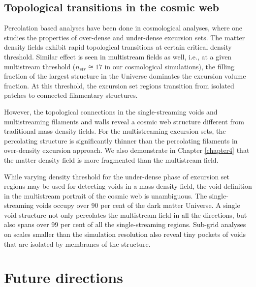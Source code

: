 \subsection{Topological transitions in the cosmic web}

Percolation based analyses have been done in cosmological analyses, where one studies the properties of over-dense and under-dense excursion sets. The matter density fields exhibit rapid topological transitions at certain critical density threshold. Similar effect is seen in multistream fields as well, i.e., at a given multistream threshold ($n_{str} \cong 17$ in our cosmological simulations), the filling fraction of the largest structure in the Universe dominates the excursion volume fraction. At this threshold, the excursion set regions transition from isolated patches to connected filamentary structures. 

However, the topological connections in the single-streaming voids and multistreaming filaments and walls reveal a cosmic web structure different from traditional mass density fields. For the multistreaming excursion sets, the percolating structure is significantly thinner than the percolating filaments in over-density excursion approach. We also demonstrate in Chapter \ref{chapter4} that the matter density field is more fragmented than the multistream field. 

While varying density threshold for the under-dense phase of excursion set regions may be used for detecting voids in a mass density field, the void definition in the multistream portrait of the cosmic web is unambiguous. The single-streaming voids occupy over 90 per cent of the dark matter Universe. A single void structure not only percolates the multistream field in all the directions, but also spans over 99 per cent of all the single-streaming regions. Sub-grid analyses on scales smaller than the simulation resolution also reveal tiny pockets of voids that are isolated by membranes of the structure. 
 


\section{Future directions}

